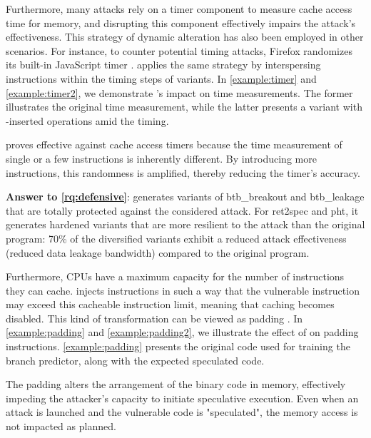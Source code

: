 Furthermore, many attacks rely on a timer component to measure cache access time for memory, and disrupting this component  effectively impairs the attack's effectiveness. 
This strategy of dynamic alteration has also been  employed in other scenarios. 
For instance, to counter potential timing attacks, Firefox randomizes its built-in JavaScript timer \cite{10.1007/978-3-319-70972-7_13}. \tool applies the same strategy by interspersing instructions within the timing steps of \wasm variants. 
In \autoref{example:timer} and \autoref{example:timer2}, we demonstrate \tool's impact on time measurements. 
The former illustrates the original time measurement, while the latter presents a variant with \tool-inserted operations amid the timing.

%

\tool proves effective against cache access timers because the time measurement of single or a few instructions is inherently different. 
By introducing more instructions, this randomness is amplified, thereby reducing the timer's accuracy.

\begin{tcolorbox}[boxrule=1pt,arc=.3em,boxsep=-1.3mm]
    \textbf{Answer to \ref{rq:defensive}}:  
    \tool generates variants of btb\_breakout and btb\_leakage that are totally protected against the considered attack. For ret2spec and pht, it generates hardened variants  that are more resilient to the attack than the original program: 70\% of the diversified variants exhibit a reduced attack effectiveness (reduced data leakage bandwidth) compared to the original program.
  \end{tcolorbox}

Furthermore, CPUs have a maximum capacity for the number of instructions they can cache.
\tool injects instructions in such a way that the vulnerable instruction may exceed this cacheable instruction limit, meaning that caching becomes disabled.
This kind of transformation can be viewed as padding \cite{padding}.
In \autoref{example:padding} and \autoref{example:padding2}, we illustrate the effect of \tool on padding instructions.
\autoref{example:padding} presents the original code used for training the branch predictor, along with the expected speculated code.

%

The padding alters the arrangement of the binary code in memory, effectively impeding the attacker's capacity to initiate speculative execution.
Even when an attack is launched and the vulnerable code is "speculated", the memory access is not impacted as planned.



